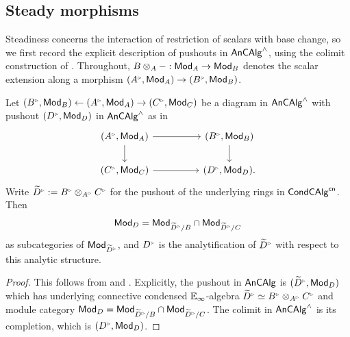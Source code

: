 \subsection{Steady morphisms}\label{subsec: steady morphisms}
Steadiness concerns the interaction of restriction of scalars with base change, so we first record the explicit description of pushouts in $\mathsf{An}\mathsf{CAlg}^{\wedge}$, using the colimit construction of . Throughout, $B\otimes_{A}-:\mathsf{Mod}_{A}\to\mathsf{Mod}_{B}$ denotes the scalar extension along a morphism $(A^{\tri},\Mod_{A})\to(B^{\tri},\Mod_{B})$.
\begin{corollary}\label{cor: pushout description}
    Let $(B^{\tri},\Mod_{B})\leftarrow(A^{\tri},\Mod_{A})\to(C^{\tri},\Mod_{C})$ be a diagram in $\mathsf{An}\mathsf{CAlg}^{\wedge}$ with pushout $(D^{\tri},\Mod_{D})$ in $\mathsf{An}\mathsf{CAlg}^{\wedge}$ as in 
    \begin{equation}\label{eqn: pushout recognition}
        \begin{tikzcd}
            {(A^{\tri},\Mod_{A})} && {(B^{\tri},\Mod_{B})} \\
            {(C^{\tri},\Mod_{C})} && {(D^{\tri},\Mod_{D}).}
            \arrow[from=1-1, to=1-3]
            \arrow[from=1-1, to=2-1]
            \arrow[from=1-3, to=2-3]
            \arrow[from=2-1, to=2-3]
        \end{tikzcd}
    \end{equation}
    Write $\widetilde{D}^{\tri}:=B^{\tri}\otimes_{A^{\tri}}C^{\tri}$ for the pushout of the underlying rings in $\mathsf{Cond}\mathsf{CAlg}^{\mathsf{cn}}$. Then 
    $$\Mod_{D}=\Mod_{\widetilde{D}^{\tri}/B}\cap\Mod_{\widetilde{D}^{\tri}/C}$$
    as subcategories of $\Mod_{\widetilde{D}^{\tri}}$, and $D^{\tri}$ is the analytification of $\widetilde{D}^{\tri}$ with respect to this analytic structure.
\end{corollary}
\begin{proof}
    This follows from  and . Explicitly, the pushout in $\mathsf{An}\mathsf{CAlg}$ is $(\widetilde{D}^{\tri},\Mod_{D})$ which has underlying connective condensed $\mathbb{E}_{\infty}$-algebra $\widetilde{D}^{\tri}\simeq B^{\tri}\otimes_{A^{\tri}}C^{\tri}$ and module category $\Mod_{D}=\Mod_{\widetilde{D}^{\tri}/B}\cap\Mod_{\widetilde{D}^{\tri}/C}$. The colimit in $\mathsf{An}\mathsf{CAlg}^{\wedge}$ is its completion, which is $(D^{\tri},\Mod_{D})$. 
\end{proof}
